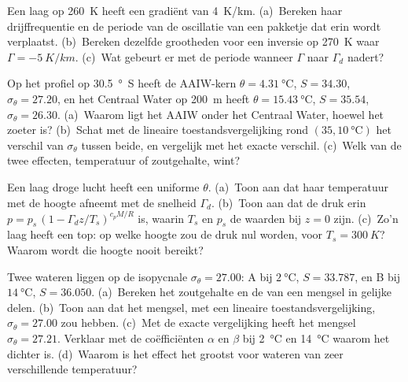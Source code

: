 \begin{exercise}[$\star\star$]\label{exo:b1:fluid-envelopes-structure:8}
Een laag op \qty{260}{K} heeft een gradiënt van \qty{4}{K/km}. (a)~Bereken haar drijffrequentie en de periode van de oscillatie van een pakketje dat erin wordt verplaatst. (b)~Bereken dezelfde grootheden voor een inversie op \qty{270}{K} waar $\Gamma = \qty{-5}{K/km}$. (c)~Wat gebeurt er met de periode wanneer $\Gamma$ naar $\Gamma_d$ nadert?
\end{exercise}

\begin{exercise}[$\star\star$]\label{exo:b1:fluid-envelopes-structure:9}
Op het profiel op \qty{30.5}{\degree S} heeft de AAIW-kern $\theta =
\qty{4.31}{\celsius}$, $S = 34.30$, $\sigma_\theta = 27.20$, en het Centraal Water op \qty{200}{m} heeft $\theta = \qty{15.43}{\celsius}$, $S = 35.54$, $\sigma_\theta = 26.30$. (a)~Waarom ligt het AAIW onder het Centraal Water, hoewel het zoeter is? (b)~Schat met de lineaire toestandsvergelijking rond $(35, \qty{10}{\celsius})$ het verschil van $\sigma_\theta$ tussen beide, en vergelijk met het exacte verschil. (c)~Welk van de twee effecten, temperatuur of zoutgehalte, wint?
\end{exercise}

\begin{exercise}[$\star\star\star$]\label{exo:b1:fluid-envelopes-structure:10}
Een laag droge lucht heeft een uniforme  $\theta$. (a)~Toon aan dat haar temperatuur met de hoogte afneemt met de snelheid $\Gamma_d$. (b)~Toon aan dat de druk erin $p = p_s\,(1 - \Gamma_d z/T_s)^{c_pM/R}$ is, waarin $T_s$ en $p_s$ de waarden bij $z = 0$ zijn. (c)~Zo'n laag heeft een top: op welke hoogte zou de druk nul worden, voor $T_s = \qty{300}{K}$? Waarom wordt die hoogte nooit bereikt?
\end{exercise}

\begin{exercise}[$\star\star\star$]\label{exo:b1:fluid-envelopes-structure:11}
Twee wateren liggen op de isopycnale $\sigma_\theta = 27.00$: A bij $\qty{2}{\celsius}$, $S = 33.787$, en B bij $\qty{14}{\celsius}$, $S = 36.050$. (a)~Bereken het zoutgehalte en de  van een mengsel in gelijke delen. (b)~Toon aan dat het mengsel, met een lineaire toestandsvergelijking, $\sigma_\theta = 27.00$ zou hebben. (c)~Met de exacte vergelijking heeft het mengsel $\sigma_\theta = 27.21$. Verklaar met de coëfficiënten $\alpha$ en $\beta$ bij \qty{2}{\celsius} en \qty{14}{\celsius} waarom het dichter is. (d)~Waarom is het effect het grootst voor wateren van zeer verschillende temperatuur?
\end{exercise}


